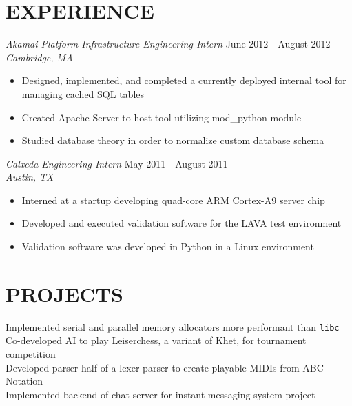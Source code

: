 \documentclass[margin]{res}
\begin{document}
\begin{resume}
\section{EXPERIENCE} {\sl Akamai Platform Infrastructure Engineering Intern} \hfill June 2012 -  August 2012 \\
                    {\sl Cambridge, MA}
                 \begin{itemize}  \itemsep -2pt %
                         \item  Designed, implemented, and completed a currently deployed internal tool for managing cached SQL tables
                         \item Created Apache Server to host tool utilizing mod\_python module 
                         \item Studied database theory in order to normalize custom database schema
                \end{itemize}

                {\sl Calxeda Engineering Intern} \hfill            May 2011 - August 2011 \\
                {\sl Austin, TX}
                 \begin{itemize}  \itemsep -2pt %
                          \item  Interned at a startup developing quad-core ARM Cortex-A9 server chip
                          \item Developed and executed validation software for the LAVA test environment
                          \item Validation software was developed in Python in a Linux environment
                 \end{itemize} 

\section{PROJECTS}
                Implemented serial and parallel memory allocators more
                performant than \texttt{libc} \\
                Co-developed AI to play Leiserchess, a variant of Khet, for 
                tournament competition \\
                Developed parser half of a lexer-parser to create playable MIDIs 
                from ABC Notation \\
                Implemented backend of chat server for instant messaging system
                project
 

\end{resume}
\end{document}
